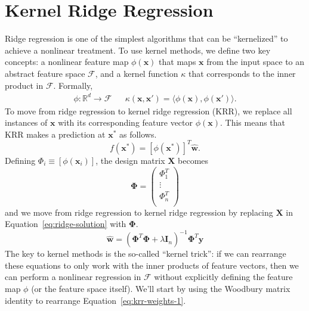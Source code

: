 \documentclass[11pt]{article}
\begin{document}
\section*{Kernel Ridge Regression} 
Ridge regression is one of the simplest algorithms that can be ``kernelized''
to achieve a nonlinear treatment.  
To use kernel methods, we define two key concepts: a nonlinear feature map
$\phi(\mathbf{x})$ that maps $\mathbf{x}$ from the input space to an abstract
feature space $\mathcal{F}$, and a kernel function $\kappa$ that corresponds to
the inner product in $\mathcal{F}$. 
Formally, 
\begin{align} 
	\phi 
: 
	\mathbb{R}^d \rightarrow \mathcal{F} 
&& 
	\kappa(\mathbf{x}, \mathbf{x}') 
=
	\langle 
		\phi(\mathbf{x}), \phi(\mathbf{x}') 
	\rangle.
\end{align} 
To move from ridge regression to kernel ridge regression (KRR), we replace all
instances of $\mathbf{x}$ with its corresponding feature vector
$\phi(\mathbf{x})$.  
This means that KRR makes a prediction at $\mathbf{x^*}$ as follows.
\begin{equation} 
	\label{eq:krr-model}
	f(\mathbf{x^*}) 
=
	[\phi(\mathbf{x^*})]^T \hat{\mathbf{w}}.  
\end{equation} 
Defining $\Phi_i \equiv [\phi(\mathbf{x}_i)]$, the design matrix $\mathbf{X}$
becomes
\begin{equation}
	\boldsymbol{\Phi}
=
	\begin{pmatrix}
		\Phi_1^T \\ 
		\vdots \\ 
		\Phi_n^T \\
	\end{pmatrix}
\end{equation}
and we move from ridge regression to kernel ridge regression by replacing
$\mathbf{X}$ in Equation~\ref{eq:ridge-solution} with $\boldsymbol{\Phi}$.
\begin{equation}
	\label{eq:krr-weights-1}
	\mathbf{\hat{w}}
=
	\left(
		\boldsymbol{\Phi}^T
		\boldsymbol{\Phi}
	+
		\lambda
		\mathbf{I}_n
	\right)^{-1}
	\boldsymbol{\Phi}^T
	\mathbf{y}
\end{equation}
The key to kernel methods is the so-called ``kernel trick'': if we can
rearrange these equations to only work with the inner products of feature
vectors, then we can perform a nonlinear regression in $\mathcal{F}$ without
explicitly defining the feature map $\phi$ (or the feature space itself).
We'll start by using the Woodbury matrix identity\cite{Hager:1989p221} to
rearrange Equation~\ref{eq:krr-weights-1}.
\end{document}

